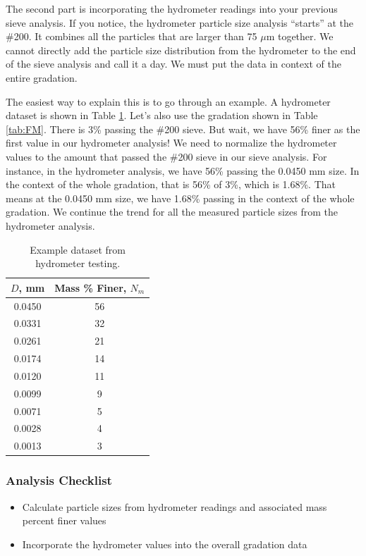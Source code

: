 \documentclass[12pt]{article}
\begin{document}
The second part is incorporating the hydrometer readings into your previous sieve analysis. If you notice, the hydrometer particle size analysis ``starts'' at the \#200. It combines all the particles that are larger than 75 $\mu$m together. We cannot directly add the particle size distribution from the hydrometer to the end of the sieve analysis and call it a day. We must put the data in context of the entire gradation.

The easiest way to explain this is to go through an example. A hydrometer dataset is shown in Table \ref{tab:hydrometer}. Let's also use the gradation shown in Table \ref{tab:FM}. There is 3\% passing the \#200 sieve. But wait, we have 56\% finer as the first value in our hydrometer analysis! We need to normalize the hydrometer values to the amount that passed the \#200 sieve in our sieve analysis. For instance, in the hydrometer analysis, we have 56\% passing the 0.0450 mm size. In the context of the whole gradation, that is 56\% of 3\%, which is 1.68\%. That means at the 0.0450 mm size, we have 1.68\% passing in the context of the whole gradation. We continue the trend for all the measured particle sizes from the hydrometer analysis. 

\begin{table}[H]
    \centering
        \caption{Example dataset from hydrometer testing.}
    \label{tab:hydrometer}
    \begin{tabular}{cc}
\hline
$D$, mm & Mass \% Finer, $N_m$ \\ \hline
0.0450 & 56\\
0.0331 & 32\\
0.0261 & 21\\
0.0174 & 14\\
0.0120 & 11\\
0.0099 & 9\\
0.0071 & 5\\
0.0028 & 4\\
0.0013 & 3\\ \hline
\end{tabular}
\end{table}

\subsubsection*{Analysis Checklist}
\begin{itemize}
    \item Calculate particle sizes from hydrometer readings and associated mass percent finer values
    \item Incorporate the hydrometer values into the overall gradation data
\end{itemize}
\end{document}
